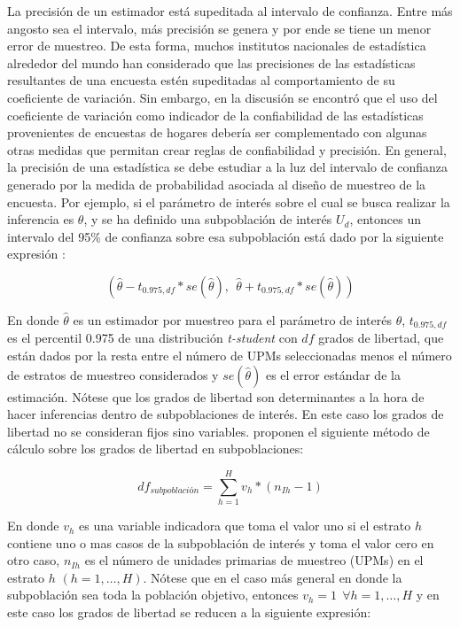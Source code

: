 La precisión de un estimador está supeditada al intervalo de confianza. Entre más angosto sea el intervalo, más precisión se genera y por ende se tiene un menor error de muestreo.
De esta forma, muchos institutos nacionales de estadística alrededor del mundo han considerado que las precisiones de las estadísticas resultantes de una encuesta estén supeditadas al comportamiento de su coeficiente de variación.
Sin embargo, en la discusión se encontró que el uso del coeficiente de variación como indicador de la confiabilidad de las estadísticas provenientes de encuestas de hogares debería ser complementado con algunas otras medidas que permitan crear reglas de confiabilidad y precisión. En general, la precisión de una estadística se debe estudiar a la luz del intervalo de confianza generado por la medida de probabilidad asociada al diseño de muestreo de la encuesta. Por ejemplo, si el parámetro de interés sobre el cual se busca realizar la inferencia es \(\theta\), y se ha definido una subpoblación de interés \(U_d\), entonces un intervalo del 95\% de confianza sobre esa subpoblación está dado por la siguiente expresión \citep{Heeringa_West_Berglund_2010}:

\[
(\hat\theta - t_{0.975, df} * se(\hat\theta), \ \ \hat\theta + t_{0.975, df} * se(\hat\theta))
\]

En donde \(\hat\theta\) es un estimador por muestreo para el parámetro de interés \(\theta\), \(t_{0.975, df}\) es el percentil 0.975 de una distribución \emph{t-student} con \(df\) grados de libertad, que están dados por la resta entre el número de UPMs seleccionadas menos el número de estratos de muestreo considerados y \(se(\hat\theta)\) es el error estándar de la estimación. Nótese que los grados de libertad son determinantes a la hora de hacer inferencias dentro de subpoblaciones de interés. En este caso los grados de libertad no se consideran fijos sino variables. \citet{Korn_Graubard_1999} proponen el siguiente método de cálculo sobre los grados de libertad en subpoblaciones:

\[
df_{subpoblación} = \sum_{h=1}^H v_h*(n_{Ih} - 1)
\]

En donde \(v_h\) es una variable indicadora que toma el valor uno si el estrato \(h\) contiene uno o mas casos de la subpoblación de interés y toma el valor cero en otro caso, \(n_{Ih}\) es el número de unidades primarias de muestreo (UPMs) en el estrato \(h\) \((h=1, \ldots, H)\). Nótese que en el caso más general en donde la subpoblación sea toda la población objetivo, entonces \(v_h = 1 \ \ \forall h=1, \ldots, H\) y en este caso los grados de libertad se reducen a la siguiente expresión:

